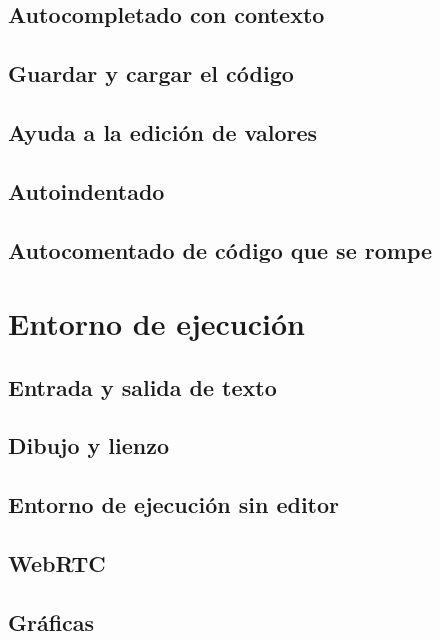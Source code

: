 \documentclass{report}
\begin{document}
	\subsection{Autocompletado con contexto}
	
	\subsection{Guardar y cargar el código}
	
	\subsection{Ayuda a la edición de valores}
	
	\subsection{Autoindentado}
	
	\subsection{Autocomentado de código que se rompe}
	
	\section{Entorno de ejecución}
	
	\subsection{Entrada y salida de texto}
	
	\subsection{Dibujo y lienzo}
	
	\subsection{Entorno de ejecución sin editor}
	
	\subsection{WebRTC}
	
	\subsection{Gráficas}
	
\end{document}
